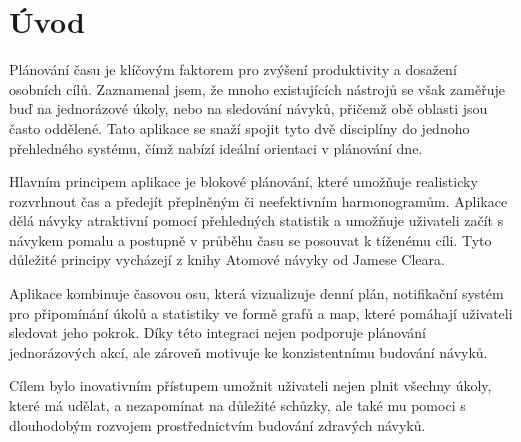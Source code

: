 \thispagestyle{empty}
\section*{Úvod}
\hspace{14pt} Plánování času je klíčovým faktorem pro zvýšení produktivity a dosažení osobních cílů. Zaznamenal jsem, že mnoho existujících nástrojů se však zaměřuje buď na jednorázové úkoly, nebo na sledování návyků, přičemž obě oblasti jsou často oddělené. Tato aplikace se snaží spojit tyto dvě disciplíny do jednoho přehledného systému, čímž nabízí ideální orientaci v plánování dne.

Hlavním principem aplikace je blokové plánování, které umožňuje realisticky rozvrhnout čas a předejít přeplněným či neefektivním harmonogramům. Aplikace dělá návyky atraktivní pomocí přehledných statistik a umožňuje uživateli začít s návykem pomalu a postupně v průběhu času se posouvat k tíženému cíli. Tyto důležité principy vycházejí z knihy Atomové návyky od Jamese Cleara.

Aplikace kombinuje časovou osu, která vizualizuje denní plán, notifikační systém pro připomínání úkolů a statistiky ve formě grafů a map, které pomáhají uživateli sledovat jeho pokrok. Díky této integraci nejen podporuje plánování jednorázových akcí, ale zároveň motivuje ke konzistentnímu budování návyků.  

Cílem bylo inovativním přístupem umožnit uživateli nejen plnit všechny úkoly, které má udělat, a nezapomínat na důležité schůzky, ale také mu pomoci s dlouhodobým rozvojem prostřednictvím budování zdravých návyků.